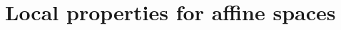 \documentclass[12pt]{amsart}
\newtheorem{theorem}{Theorem}[section]
\theoremstyle{definition}
\newtheorem*{axiom}{Axiom}
\newcommand{\mbb}[1]{\mathbb{#1}}
\newcommand{\I}{\mbb I}
\newcommand{\ms}[1]{\mathsf{#1}}
\newcommand{\eq}{\leftrightarrow}
\begin{document}






\section{Local properties for affine spaces}
\end{document}
